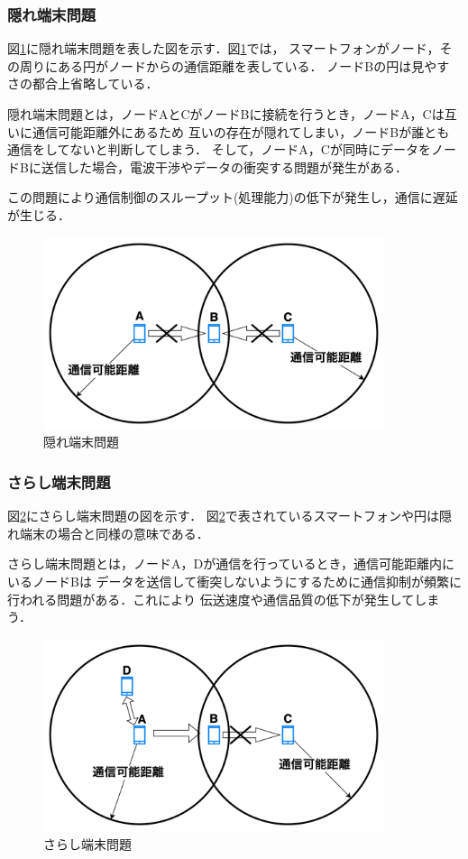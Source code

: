 \documentclass[a4paper, 11pt]{ltjsarticle}
\begin{document}
\subsubsection{隠れ端末問題}
図\ref{hidden_problem}に隠れ端末問題を表した図を示す．図\ref{hidden_problem}では，
スマートフォンがノード，その周りにある円がノードからの通信距離を表している．
ノードBの円は見やすさの都合上省略している．

隠れ端末問題とは，ノードAとCがノードBに接続を行うとき，ノードA，Cは互いに通信可能距離外にあるため
互いの存在が隠れてしまい，ノードBが誰とも通信をしてないと判断してしまう．
そして，ノードA，Cが同時にデータをノードBに送信した場合，電波干渉やデータの衝突する問題が発生がある．

この問題により通信制御のスループット(処理能力)の低下が発生し，通信に遅延が生じる．
\begin{figure}[H]
  \centering
  \includegraphics[width=100mm]{hidden_terminal_problem.png}
  \caption{隠れ端末問題}
  \label{hidden_problem}
\end{figure}

\subsubsection{さらし端末問題}
図\ref{exposed_problem}にさらし端末問題の図を示す．
図\ref{exposed_problem}で表されているスマートフォンや円は隠れ端末の場合と同様の意味である．

さらし端末問題とは，ノードA，Dが通信を行っているとき，通信可能距離内にいるノードBは
データを送信して衝突しないようにするために通信抑制が頻繁に行われる問題がある．これにより
伝送速度や通信品質の低下が発生してしまう．
\begin{figure}[H]
  \centering
  \includegraphics[width=100mm]{exposed_terminal_problem.png}
  \caption{さらし端末問題}
  \label{exposed_problem}
\end{figure}
\end{document}

